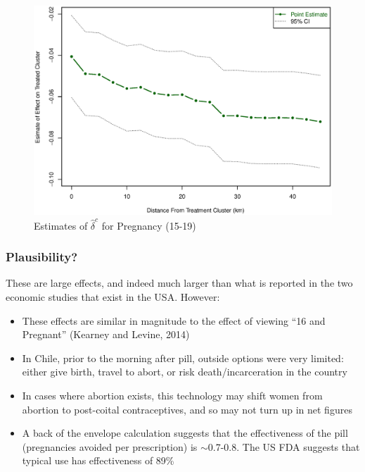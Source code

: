 \documentclass[10pt,letterpaper,subeqn]{beamer}
\begin{document}



\begin{frame}[label=dist1519]
\begin{figure}[htpb!]
\begin{center}
\caption{Estimates of $\hat\delta^c$ for Pregnancy (15-19)}
\label{TEENfig:Dist1519}
\vspace{-5mm}
\includegraphics[scale=0.44]{./../../Figures/Dist1519.eps} 
\end{center}
\end{figure}
\hyperlink{dist2034}{}
\end{frame}

\begin{frame}[label=plaus]
\frametitle{Plausibility?}
These are large effects, and indeed much larger than what is reported in the two economic studies that exist in the USA.  However:
\begin{itemize}
\item These effects are similar in magnitude to the effect of viewing ``16 and Pregnant'' (Kearney and Levine, 2014)
\item In Chile, prior to the morning after pill, outside options were very limited: either give birth, travel to abort, or risk death/incarceration in the country
\item In cases where abortion exists, this technology may shift women from abortion to post-coital contraceptives, and so may not turn up in net figures
\item A back of the envelope calculation suggests that the effectiveness of the pill (pregnancies avoided per prescription) is $\sim$0.7-0.8.  The US FDA suggests that typical use has effectiveness of 89\%
\hyperlink{plausR}{}
\end{itemize}
\end{frame}
\end{document}
